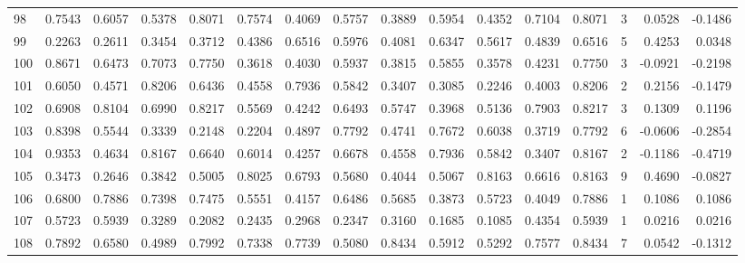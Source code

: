 \begin{tabular}{lrrrrrrrrrrrrrrr}
98  &      0.7543 &  0.6057 &  0.5378 &  0.8071 &  0.7574 &  0.4069 &  0.5757 &  0.3889 &  0.5954 &  0.4352 &   0.7104 &     0.8071 &      3 &                    0.0528 &                    -0.1486 \\
99  &      0.2263 &  0.2611 &  0.3454 &  0.3712 &  0.4386 &  0.6516 &  0.5976 &  0.4081 &  0.6347 &  0.5617 &   0.4839 &     0.6516 &      5 &                    0.4253 &                     0.0348 \\
100 &      0.8671 &  0.6473 &  0.7073 &  0.7750 &  0.3618 &  0.4030 &  0.5937 &  0.3815 &  0.5855 &  0.3578 &   0.4231 &     0.7750 &      3 &                   -0.0921 &                    -0.2198 \\
101 &      0.6050 &  0.4571 &  0.8206 &  0.6436 &  0.4558 &  0.7936 &  0.5842 &  0.3407 &  0.3085 &  0.2246 &   0.4003 &     0.8206 &      2 &                    0.2156 &                    -0.1479 \\
102 &      0.6908 &  0.8104 &  0.6990 &  0.8217 &  0.5569 &  0.4242 &  0.6493 &  0.5747 &  0.3968 &  0.5136 &   0.7903 &     0.8217 &      3 &                    0.1309 &                     0.1196 \\
103 &      0.8398 &  0.5544 &  0.3339 &  0.2148 &  0.2204 &  0.4897 &  0.7792 &  0.4741 &  0.7672 &  0.6038 &   0.3719 &     0.7792 &      6 &                   -0.0606 &                    -0.2854 \\
104 &      0.9353 &  0.4634 &  0.8167 &  0.6640 &  0.6014 &  0.4257 &  0.6678 &  0.4558 &  0.7936 &  0.5842 &   0.3407 &     0.8167 &      2 &                   -0.1186 &                    -0.4719 \\
105 &      0.3473 &  0.2646 &  0.3842 &  0.5005 &  0.8025 &  0.6793 &  0.5680 &  0.4044 &  0.5067 &  0.8163 &   0.6616 &     0.8163 &      9 &                    0.4690 &                    -0.0827 \\
106 &      0.6800 &  0.7886 &  0.7398 &  0.7475 &  0.5551 &  0.4157 &  0.6486 &  0.5685 &  0.3873 &  0.5723 &   0.4049 &     0.7886 &      1 &                    0.1086 &                     0.1086 \\
107 &      0.5723 &  0.5939 &  0.3289 &  0.2082 &  0.2435 &  0.2968 &  0.2347 &  0.3160 &  0.1685 &  0.1085 &   0.4354 &     0.5939 &      1 &                    0.0216 &                     0.0216 \\
108 &      0.7892 &  0.6580 &  0.4989 &  0.7992 &  0.7338 &  0.7739 &  0.5080 &  0.8434 &  0.5912 &  0.5292 &   0.7577 &     0.8434 &      7 &                    0.0542 &                    -0.1312 \\

\end{tabular}

